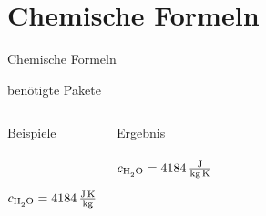 \section{Chemische Formeln}
\begin{frame}[fragile]{Chemische Formeln}
  \begin{block}{benötigte Pakete}
    \begin{lstverbatim}
    \usepackage[version=3]{mhchem}
    \end{lstverbatim}
  \end{block}
  \begin{columns}[T]
    \begin{block}{Beispiele}
      \begin{lstverbatim}
       \\
       \\
      $c_{\ce{H2O}} = \SI{4184}{\joule\per\kilo\gram\kelvin}$ \\
       \\
      \end{lstverbatim}
    \end{block}
    \linespread{1.3}
    \begin{block}{Ergebnis}
         \\
         \\
        $c_{\ce{H2O}} = \SI{4184}{\joule\per\kilo\gram\per\kelvin}$ \\
         \\
    \end{block}
  \end{columns}
\end{frame}
